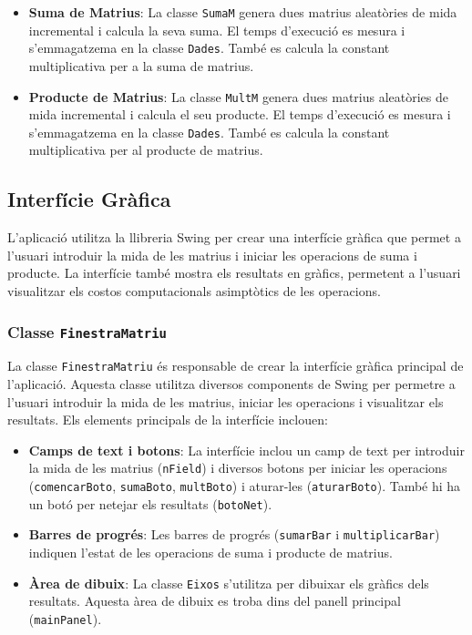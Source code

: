 \documentclass{ieeetj}
\begin{document}
\begin{itemize}
    \item \textbf{Suma de Matrius}: La classe \texttt{SumaM} genera dues matrius aleatòries de mida incremental i calcula la seva suma. El temps d'execució es mesura i s'emmagatzema en la classe \texttt{Dades}. També es calcula la constant multiplicativa per a la suma de matrius.
    \item \textbf{Producte de Matrius}: La classe \texttt{MultM} genera dues matrius aleatòries de mida incremental i calcula el seu producte. El temps d'execució es mesura i s'emmagatzema en la classe \texttt{Dades}. També es calcula la constant multiplicativa per al producte de matrius.
\end{itemize}

\subsection{Interfície Gràfica}
L'aplicació utilitza la llibreria Swing per crear una interfície gràfica que permet a l'usuari introduir la mida de les matrius i iniciar les operacions de suma i producte. La interfície també mostra els resultats en gràfics, permetent a l'usuari visualitzar els costos computacionals asimptòtics de les operacions.

\subsubsection{Classe \texttt{FinestraMatriu}}
La classe \texttt{FinestraMatriu} és responsable de crear la interfície gràfica principal de l'aplicació. Aquesta classe utilitza diversos components de Swing per permetre a l'usuari introduir la mida de les matrius, iniciar les operacions i visualitzar els resultats. Els elements principals de la interfície inclouen:

\begin{itemize}
    \item \textbf{Camps de text i botons}: La interfície inclou un camp de text per introduir la mida de les matrius (\texttt{nField}) i diversos botons per iniciar les operacions (\texttt{comencarBoto}, \texttt{sumaBoto}, \texttt{multBoto}) i aturar-les (\texttt{aturarBoto}). També hi ha un botó per netejar els resultats (\texttt{botoNet}).
    \item \textbf{Barres de progrés}: Les barres de progrés (\texttt{sumarBar} i \texttt{multiplicarBar}) indiquen l'estat de les operacions de suma i producte de matrius.
    \item \textbf{Àrea de dibuix}: La classe \texttt{Eixos} s'utilitza per dibuixar els gràfics dels resultats. Aquesta àrea de dibuix es troba dins del panell principal (\texttt{mainPanel}).
\end{itemize}
\end{document}
